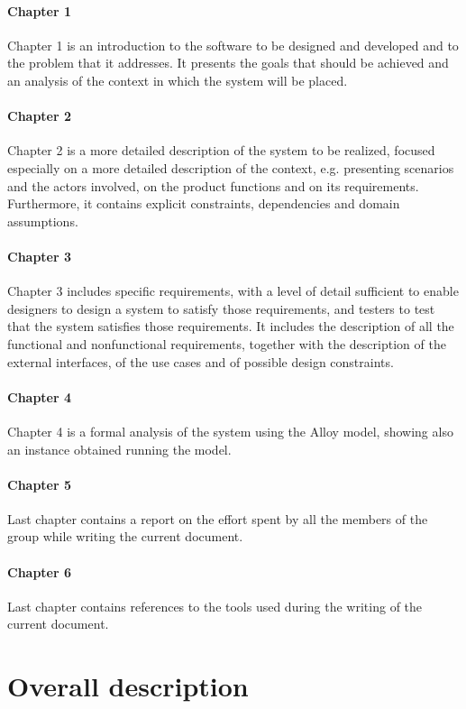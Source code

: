 \documentclass[a4paper,oneside,11pt]{book}   %
\begin{document}
    \subsubsection{Chapter 1} 
    Chapter 1 is an introduction to the software to be designed and developed and to the problem that it addresses. It presents the goals that should be achieved and an analysis of the context in which the system will be placed.
    \subsubsection{Chapter 2} 
    Chapter 2 is a more detailed description of the system to be realized, focused especially on a more detailed description of the context, e.g. presenting scenarios and the actors involved, on the product functions and on its requirements. Furthermore, it contains explicit constraints, dependencies and domain assumptions.
    \subsubsection{Chapter 3} Chapter 3 includes specific requirements, with a level of detail sufficient to enable designers to design a system to satisfy those requirements, and testers to test that the system satisfies those requirements. It includes the description of all the functional and nonfunctional requirements, together with the description of the external interfaces, of the use cases and of possible design constraints.
    \subsubsection{Chapter 4} 
    Chapter 4 is a formal analysis of the system using the Alloy model, showing also an instance obtained running the model.
    \subsubsection{Chapter 5}
    Last chapter contains a report on the effort spent by all the members of the group while writing the current document.
    \subsubsection{Chapter 6}
    Last chapter contains references to the tools used during the writing of the current document.


\chapter{Overall description}
\end{document}
